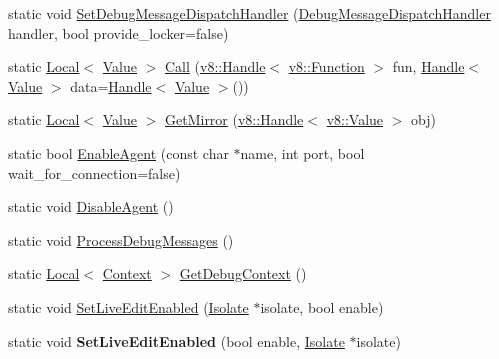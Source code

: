 \begin{DoxyCompactItemize}
\item 
static void \hyperlink{classv8_1_1Debug_a5147f6cfeb9b87a67630b8c959996e9c}{Set\-Debug\-Message\-Dispatch\-Handler} (\hyperlink{classv8_1_1Debug_a0fe6dbc9393500d7e02cc12fae1c7f66}{Debug\-Message\-Dispatch\-Handler} handler, bool provide\-\_\-locker=false)
\item 
static \hyperlink{classv8_1_1Local}{Local}$<$ \hyperlink{classv8_1_1Value}{Value} $>$ \hyperlink{classv8_1_1Debug_a49a3e0cf585cfd201d8ab1bc395d0593}{Call} (\hyperlink{classv8_1_1Handle}{v8\-::\-Handle}$<$ \hyperlink{classv8_1_1Function}{v8\-::\-Function} $>$ fun, \hyperlink{classv8_1_1Handle}{Handle}$<$ \hyperlink{classv8_1_1Value}{Value} $>$ data=\hyperlink{classv8_1_1Handle}{Handle}$<$ \hyperlink{classv8_1_1Value}{Value} $>$())
\item 
static \hyperlink{classv8_1_1Local}{Local}$<$ \hyperlink{classv8_1_1Value}{Value} $>$ \hyperlink{classv8_1_1Debug_aa7d07c7d5c9ee2eaaa9af310bcbf58f5}{Get\-Mirror} (\hyperlink{classv8_1_1Handle}{v8\-::\-Handle}$<$ \hyperlink{classv8_1_1Value}{v8\-::\-Value} $>$ obj)
\item 
static bool \hyperlink{classv8_1_1Debug_a78506e80b599010624c5fcde72a643a7}{Enable\-Agent} (const char $\ast$name, int port, bool wait\-\_\-for\-\_\-connection=false)
\item 
static void \hyperlink{classv8_1_1Debug_aa9b8f5fe4545f52f5937d61e972dcbf0}{Disable\-Agent} ()
\item 
static void \hyperlink{classv8_1_1Debug_a888e06766caee0380c6aa010b00e1a54}{Process\-Debug\-Messages} ()
\item 
static \hyperlink{classv8_1_1Local}{Local}$<$ \hyperlink{classv8_1_1Context}{Context} $>$ \hyperlink{classv8_1_1Debug_a2343a321b0db41324b7e8a7402f57cf0}{Get\-Debug\-Context} ()
\item 
static void \hyperlink{classv8_1_1Debug_ab635f979d369bed13187e2594d825517}{Set\-Live\-Edit\-Enabled} (\hyperlink{classv8_1_1Isolate}{Isolate} $\ast$isolate, bool enable)
\item 
\hypertarget{classv8_1_1Debug_a0921c5c49fa0401660de43b0f6ad09ed}{static void {\bfseries Set\-Live\-Edit\-Enabled} (bool enable, \hyperlink{classv8_1_1Isolate}{Isolate} $\ast$isolate)}\label{classv8_1_1Debug_a0921c5c49fa0401660de43b0f6ad09ed}

\end{DoxyCompactItemize}


